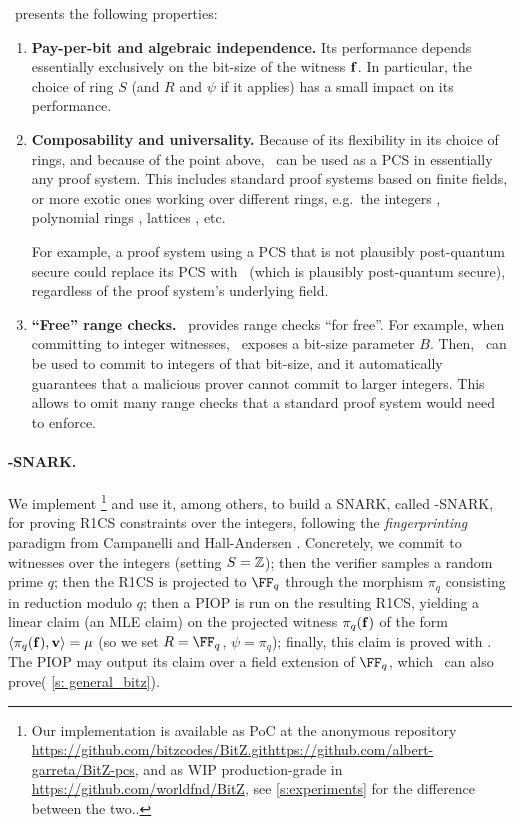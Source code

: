 \noindent \ftwoz\ presents the following properties:
 \begin{enumerate}[leftmargin=*]
     \item  \textbf{Pay-per-bit and algebraic independence.} Its performance  depends essentially exclusively on the bit-size of the witness $\mathbf{f}$. In particular, the choice of ring $S$ (and $R$ and $\psi$ if it applies) has a small impact on its performance. 
     \item \textbf{Composability and universality.} Because of its flexibility in its choice of rings, and because of the point above, \ftwoz\  can be used as a PCS in essentially any proof system. This includes standard proof systems based on finite fields, or more exotic ones working over different rings, e.g.\ the integers \cite{zaratan,limber,zinc,zincplus,qaren}, polynomial rings \cite{zincplus}, lattices \cite{beullens2023labrador,Greyhound,SALSAA,Hachi}, etc.
     
     For example, a proof system using a PCS that is not plausibly post-quantum secure could replace its PCS with \ftwoz \ (which is plausibly post-quantum secure), regardless of the proof system's underlying field. %
     \item \textbf{``Free'' range checks.} \ftwoz\ provides range checks ``for free''. For example, when  committing  to integer witnesses, \ftwoz\ exposes a bit-size parameter $B$. Then, \ftwoz\ can be used to commit to integers of that bit-size, and it automatically guarantees that a malicious prover cannot commit to larger integers. This allows to omit many range checks that a standard proof system would need to enforce.
\end{enumerate}




 \iflncs 
 \else 
 \fi

\paragraph{\ftwoz-SNARK.} We implement \ftwoz\footnote{Our implementation is available as PoC at \iflncs the anonymous repository \url{https://github.com/bitzcodes/BitZ.git}\else\url{https://github.com/albert-garreta/BitZ-pcs}, and as WIP production-grade in \url{https://github.com/worldfnd/BitZ}, see \cref{s:experiments} for the difference between the two.\fi.} and use it, among others, to build a SNARK, called \ftwoz-SNARK, for proving R1CS constraints over the integers, following the \emph{fingerprinting} paradigm from Campanelli and Hall-Andersen \cite{zaratan}. Concretely, we commit to witnesses over the integers (setting $S=\mathbb{Z}$); then the verifier samples a random prime $q$; then the R1CS is projected to $\FF_q$ through the morphism $\pi_q$ consisting in reduction modulo $q$; then a PIOP is run on the resulting R1CS, yielding a linear claim (an MLE claim) on the projected witness $\pi_q(\mathbf{f})$ of the form $\langle \pi_q(\mathbf{f}), \mathbf{v}\rangle = \mu$ (so we set $R=\FF_q$, $\psi=\pi_q$); finally, this claim is proved with \ftwoz. The PIOP may output its claim over a field extension of $\FF_q$, which \ftwoz\ can also prove\iflncs( \cref{s: general_bitz})\else\fi. 

